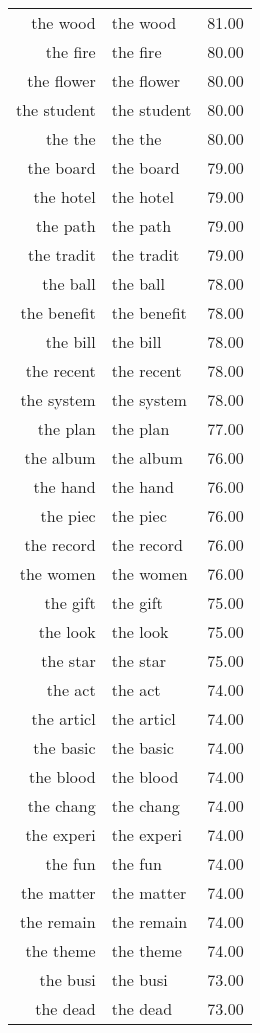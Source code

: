 \begin{table}[ht]
\begin{tabular}{rlr}
  the wood & the wood & 81.00 \\ 
  the fire & the fire & 80.00 \\ 
  the flower & the flower & 80.00 \\ 
  the student & the student & 80.00 \\ 
  the the & the the & 80.00 \\ 
  the board & the board & 79.00 \\ 
  the hotel & the hotel & 79.00 \\ 
  the path & the path & 79.00 \\ 
  the tradit & the tradit & 79.00 \\ 
  the ball & the ball & 78.00 \\ 
  the benefit & the benefit & 78.00 \\ 
  the bill & the bill & 78.00 \\ 
  the recent & the recent & 78.00 \\ 
  the system & the system & 78.00 \\ 
  the plan & the plan & 77.00 \\ 
  the album & the album & 76.00 \\ 
  the hand & the hand & 76.00 \\ 
  the piec & the piec & 76.00 \\ 
  the record & the record & 76.00 \\ 
  the women & the women & 76.00 \\ 
  the gift & the gift & 75.00 \\ 
  the look & the look & 75.00 \\ 
  the star & the star & 75.00 \\ 
  the act & the act & 74.00 \\ 
  the articl & the articl & 74.00 \\ 
  the basic & the basic & 74.00 \\ 
  the blood & the blood & 74.00 \\ 
  the chang & the chang & 74.00 \\ 
  the experi & the experi & 74.00 \\ 
  the fun & the fun & 74.00 \\ 
  the matter & the matter & 74.00 \\ 
  the remain & the remain & 74.00 \\ 
  the theme & the theme & 74.00 \\ 
  the busi & the busi & 73.00 \\ 
  the dead & the dead & 73.00 \\ 

\end{tabular}
\end{table}
